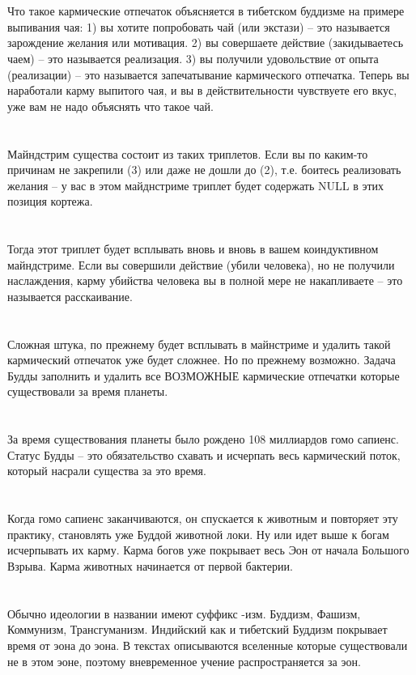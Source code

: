\\
\\
Что такое кармические отпечаток объясняется в тибетском буддизме на примере выпивания чая: 1) вы хотите попробовать чай (или экстази) -- это называется зарождение желания или мотивация. 2) вы совершаете действие (закидываетесь чаем) -- это называется реализация. 3) вы получили удовольствие от опыта (реализации) -- это называется запечатывание кармического отпечатка. Теперь вы наработали карму выпитого чая, и вы в действительности чувствуете его вкус, уже вам не надо объяснять что такое чай.\\
\\
\\
Майндстрим существа состоит из таких триплетов. Если вы по каким-то причинам не закрепили (3) или даже не дошли до (2), т.е. боитесь реализовать желания -- у вас в этом майднстриме триплет будет содержать NULL в этих позиция кортежа.\\
\\
\\
Тогда этот триплет будет всплывать вновь и вновь в вашем коиндуктивном майндстриме. Если вы совершили действие (убили человека), но не получили наслаждения, карму убийства человека вы в полной мере не накапливаете -- это называется расскаивание.\\
\\
\\
Сложная штука, по прежнему будет всплывать в майнстриме и удалить такой кармический отпечаток уже будет сложнее. Но по прежнему возможно. Задача Будды заполнить и удалить все ВОЗМОЖНЫЕ кармические отпечатки которые существовали за время планеты.\\
\\
\\
За время существования планеты было рождено 108 миллиардов гомо сапиенс. Статус Будды -- это обязательство схавать и исчерпать весь кармический поток, который насрали существа за это время.\\
\\
\\
Когда гомо сапиенс заканчиваются, он спускается к животным и повторяет эту практику, становлять уже Буддой животной локи. Ну или идет выше к богам исчерпывать их карму. Карма богов уже покрывает весь Эон от начала Большого Взрыва. Карма животных начинается от первой бактерии.\\
\\
\\
Обычно идеологии в названии имеют суффикс -изм. Буддизм, Фашизм, Коммунизм, Трансгуманизм. Индийский как и тибетский Буддизм покрывает время от эона до эона. В текстах описываются вселенные которые существовали не в этом эоне, поэтому вневременное учение распространяется за эон.\\
